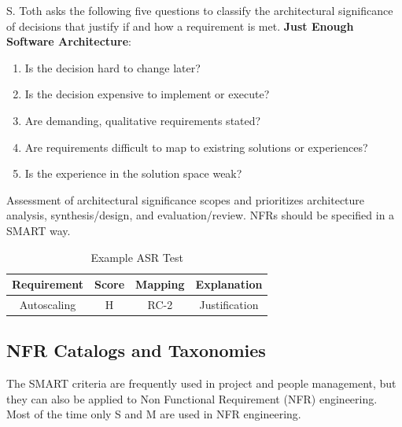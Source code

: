 \documentclass[../Main.tex]{subfiles}
\begin{document}
S. Toth asks the following five questions to classify the architectural significance of decisions that justify if and
how a requirement is met.
\textbf{Just Enough Software Architecture}:
\begin{enumerate}
    \item Is the decision hard to change later?
    \item Is the decision expensive to implement or execute?
    \item Are demanding, qualitative requirements stated?
    \item Are requirements difficult to map to existring solutions or experiences?
    \item Is the experience in the solution space weak?
\end{enumerate}

Assessment of architectural significance scopes and prioritizes architecture analysis, 
synthesis/design, and evaluation/review. NFRs should be specified in a SMART way.


\begin{table}[h]
    \centering
    \begin{tabular}{|c|c|c|c|}
    \hline
    Requirement & Score & Mapping & Explanation \\
    \hline
    Autoscaling & H & RC-2 & Justification \\
    \hline
    \end{tabular}
    \caption{Example ASR Test}
\end{table}


\subsection{NFR Catalogs and Taxonomies}
The SMART criteria are frequently used in project and people management, but they can also be applied to Non
Functional Requirement (NFR) engineering. Most of the time only S and M are used in NFR engineering.

\end{document}
